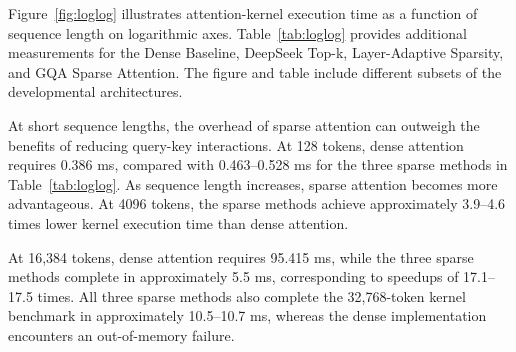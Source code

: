 \documentclass[11pt]{article}
\begin{document}
Figure~\ref{fig:loglog} illustrates attention-kernel execution time as a function of sequence length on logarithmic axes. Table~\ref{tab:loglog} provides additional measurements for the Dense Baseline, DeepSeek Top-k, Layer-Adaptive Sparsity, and GQA Sparse Attention. The figure and table include different subsets of the developmental architectures.

At short sequence lengths, the overhead of sparse attention can outweigh the benefits of reducing query-key interactions. At 128 tokens, dense attention requires 0.386 ms, compared with 0.463--0.528 ms for the three sparse methods in Table~\ref{tab:loglog}. As sequence length increases, sparse attention becomes more advantageous. At 4096 tokens, the sparse methods achieve approximately 3.9--4.6 times lower kernel execution time than dense attention.

At 16,384 tokens, dense attention requires 95.415 ms, while the three sparse methods complete in approximately 5.5 ms, corresponding to speedups of 17.1--17.5 times. All three sparse methods also complete the 32,768-token kernel benchmark in approximately 10.5--10.7 ms, whereas the dense implementation encounters an out-of-memory failure.


\end{document}
